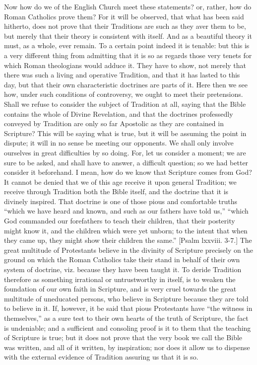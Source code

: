 Now how do we of the English Church meet these statements? or,
rather, how do Roman Catholics prove them? For it will be observed,
that what has been said hitherto, does not prove that their Traditions
are such as they aver them to be, but merely that their theory is
consistent with itself. And as a beautiful theory it must, as a whole,
ever remain. To a certain point indeed it is tenable: but this is a
very different thing from admitting that it is so as regards those
very tenets for which Roman theologians would adduce it. They have to
show, not merely that there was such a living and operative Tradition,
and that it has lasted to this day, but that their own characteristic
doctrines are parts of it. Here then we see how, under such conditions
of controversy, we ought to meet their pretensions. Shall we refuse to
consider the subject of Tradition at all, saying that the Bible
contains the whole of Divine Revelation, and that the doctrines
professedly conveyed by Tradition are only so far Apostolic as they
are contained in Scripture? This will be saying what is true, but it
will be assuming the point in dispute; it will in no sense be meeting
our opponents. We shall only involve ourselves in great difficulties
by so doing. For, let us consider a moment; we are sure to be asked,
and shall have to answer, a difficult question; so we had better
consider it beforehand. I mean, how do we know that Scripture comes
from God? It cannot be denied that we of this age receive it upon
general Tradition; we receive through Tradition both the Bible itself,
and the doctrine that it is divinely inspired. That doctrine is one of
those pious and comfortable truths ``which we have heard and
known, and such as our fathers have told us,'' ``which God
commanded our forefathers to teach their children, that their
posterity might know it, and the children which were yet unborn; to
the intent that when they came up, they might show their children
the same.'' [Psalm lxxviii. 3-7.] The great multitude of
Protestants believe in the divinity of Scripture precisely on the
ground on which the Roman Catholics take their stand in behalf of
their own system of doctrine, viz. because they have been taught it.
To deride Tradition therefore as something irrational or untrustworthy
in itself, is to weaken the foundation of our own faith in Scripture,
and is very cruel towards the great multitude of uneducated persons,
who believe in Scripture because they are told to believe in it. If,
however, it be said that pious Protestants have ``the witness in
themselves,'' as a sure test to their own hearts of the truth of
Scripture, the fact is undeniable; and a sufficient and consoling
proof is it to them that the teaching of Scripture is true; but it
does not prove that the very book we call the Bible was written, and
all of it written, by inspiration; nor does it allow us to dispense
with the external evidence of Tradition assuring us that it is so.

